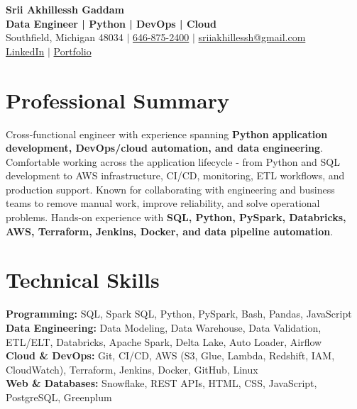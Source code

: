 \documentclass[letterpaper,10pt]{article}
\begin{document}
\fontsize{9.35pt}{10.45pt}\selectfont

\begin{center}
    {\LARGE \textbf{Srii Akhillessh Gaddam}} \\[-1pt]
    \textbf{Data Engineer | Python | DevOps | Cloud} \\[2pt]
    Southfield, Michigan 48034 $|$
    \href{tel:6468752400}{646-875-2400} $|$
    \href{mailto:sriiakhillessh@gmail.com}{sriiakhillessh@gmail.com} \\[1pt]
    \href{https://www.linkedin.com/in/srii-akhiilessh-gaddam-b48668191/}{LinkedIn} $|$
    \href{https://sriiakhillesshg.github.io/portfolio/}{Portfolio}
\end{center}
\vspace{-8pt}

\section{Professional Summary}
\small{Cross-functional engineer with experience spanning \textbf{Python application development, DevOps/cloud automation, and data engineering}. Comfortable working across the application lifecycle - from Python and SQL development to AWS infrastructure, CI/CD, monitoring, ETL workflows, and production support. Known for collaborating with engineering and business teams to remove manual work, improve reliability, and solve operational problems. Hands-on experience with \textbf{SQL, Python, PySpark, Databricks, AWS, Terraform, Jenkins, Docker, and data pipeline automation}.}

\section{Technical Skills}
\small{
\textbf{Programming:} SQL, Spark SQL, Python, PySpark, Bash, Pandas, JavaScript \\
\textbf{Data Engineering:} Data Modeling, Data Warehouse, Data Validation, ETL/ELT, Databricks, Apache Spark, Delta Lake, Auto Loader, Airflow \\
\textbf{Cloud \& DevOps:} Git, CI/CD, AWS (S3, Glue, Lambda, Redshift, IAM, CloudWatch), Terraform, Jenkins, Docker, GitHub, Linux \\
\textbf{Web \& Databases:} Snowflake, REST APIs, HTML, CSS, JavaScript, PostgreSQL, Greenplum
}
\end{document}

